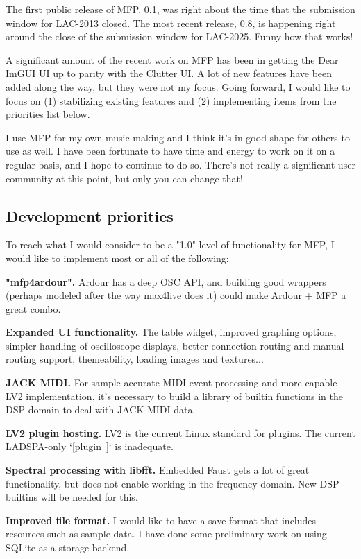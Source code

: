 \documentclass[a4paper]{article}
\begin{document}
The first public release of MFP, 0.1, was right about the time that the
submission window for LAC-2013 closed. The most recent release,
0.8, is happening right around the close of the submission window
for LAC-2025. Funny how that works!

A significant amount of the recent work on MFP has been in
getting the Dear ImGUI UI up to parity with the Clutter UI. A lot
of new features have been added along the way, but they were not
my focus. Going forward, I would like to focus on (1) stabilizing
existing features and (2) implementing items from the priorities
list below.

I use MFP for my own music making and I think it's in good shape
for others to use as well. I have been fortunate to have time and
energy to work on it on a regular basis, and I hope to continue
to do so. There's not really a significant user community at this
point, but only you can change that!

\subsection{Development priorities}

To reach what I would consider to be a "1.0" level of
functionality for MFP, I would like to implement most or all of
the following:

{\bf "mfp4ardour".} Ardour has a deep OSC API, and building good
wrappers (perhaps modeled after the way max4live does it) could
make Ardour + MFP a great combo.

{\bf Expanded UI functionality.} The table widget, improved
graphing options, simpler handling of oscilloscope displays,
better connection routing and manual routing support, themeability,
loading images and textures...

{\bf JACK MIDI.} For sample-accurate MIDI event processing and
more capable LV2 implementation, it's necessary to build a
library of builtin functions in the DSP domain to deal with JACK
MIDI data.

{\bf LV2 plugin hosting.} LV2 is the current Linux standard for
plugins. The current LADSPA-only `[plugin~]` is inadequate.

{\bf Spectral processing with libfft.} Embedded Faust gets a lot
of great functionality, but does not enable working in the
frequency domain. New DSP builtins will be needed for this.

{\bf Improved file format.} I would like to have a save format
that includes resources such as sample data. I have done some
preliminary work on using SQLite as a storage backend.
\end{document}
